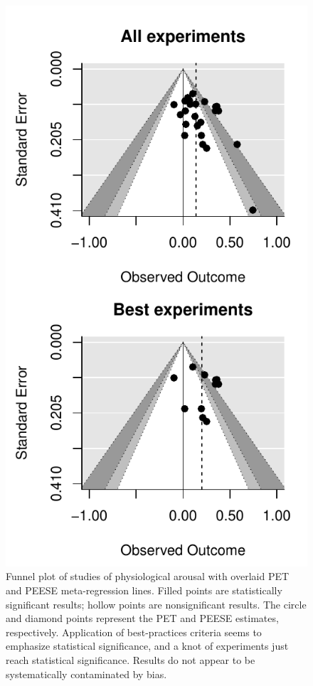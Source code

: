 \documentclass[man, mask]{apa6}
\begin{document}
\begin{figure}
	\includegraphics[scale=0.75]{funnels-0_PhysArous.pdf}
	\caption{Funnel plot of studies of physiological arousal with overlaid PET and PEESE meta-regression lines. Filled points are statistically significant results; hollow points are nonsignificant results. The circle and diamond points represent the PET and PEESE estimates, respectively. Application of best-practices criteria seems to emphasize statistical significance, and a knot of experiments just reach statistical significance. Results do not appear to be systematically contaminated by bias.}
	\label{funnel-physarous}
\end{figure}
\end{document}

